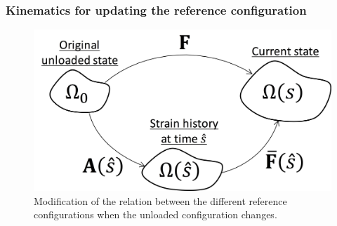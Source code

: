 \subsubsection{Kinematics for updating the reference configuration}

\begin{figure}[hbt]
\centering
\includegraphics[width=0.35\paperwidth]{Images/chapter4/figure7}
\caption{Modification of the relation between the different reference configurations when the unloaded configuration changes.}
\label{fig:PSevolution}
\end{figure}

